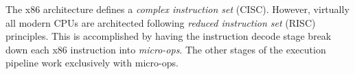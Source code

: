 
The x86 architecture defines a \textit{complex instruction set} (CISC).
However, virtually all modern CPUs are architected following \textit{reduced
instruction set} (RISC) principles. This is accomplished by having the
instruction decode stage break down each x86 instruction into
\textit{micro-ops}. The other stages of the execution pipeline work exclusively
with micro-ops.







